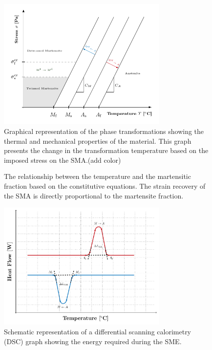 \begin{figure}[hbt]
    \centering
    \includegraphics[width=0.75\textwidth]{images/chap2/phase-diagram-graph.pdf}
    \caption{Graphical representation of the phase transformations showing the thermal and mechanical properties of the material. This graph presents the change in the transformation temperature based on the imposed stress on the SMA.\todocite(add color)}
    \label{fig:phase-diagram-graph}
\end{figure}

\begin{figure}[hbt]
    \centering
    \resizebox{0.75\textwidth}{!}{}
    \caption{The relationship between the temperature and the martensitic fraction based on the \cite{brinsonOneDimensionalConstitutiveBehavior1993} constitutive equations. The strain recovery of the SMA is directly proportional to the martensite fraction.}
    \label{fig:sma-temperature-transformation-model}
\end{figure}

\begin{figure}[hbt]
    \centering
    \includegraphics[width=0.75\textwidth]{images/chap2/dsc-graph.pdf}
    \caption{Schematic representation of a differential scanning calorimetry (DSC) graph showing the energy required during the SME.}
    \label{fig:dsc-graph}
\end{figure}

